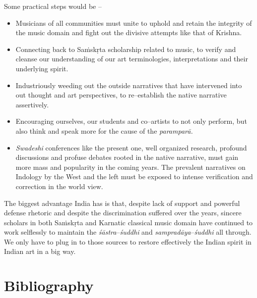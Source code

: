 Some practical steps would be –

\begin{itemize}
\item Musicians of all communities must unite to uphold and retain the integrity of the music domain and fight out the divisive attempts like that of Krishna.

 \item Connecting back to Saṁskṛta scholarship related to music, to verify and cleanse our understanding of our art terminologies, interpretations and their underlying spirit.

 \item Industriously weeding out the outside narratives that have intervened into out thought and art perspectives, to re–establish the native narrative assertively.

 \item Encouraging ourselves, our students and co–artists to not only perform, but also think and speak more for the cause of the \textit{paramparā.}

 \item \textit{Swadeshi} conferences like the present one, well organized research, profound discussions and profuse debates rooted in the native narrative, must gain more mass and popularity in the coming years. The prevalent narratives on Indology by the West and the left must be exposed to intense verification and correction in the world view.

\end{itemize}

The biggest advantage India has is that, despite lack of support and powerful defense rhetoric and despite the discrimination suffered over the years, sincere scholars in both Saṁskṛta and Karnatic classical music domain have continued to work selflessly to maintain the \textit{śāstra}–\textit{śuddhi} and \textit{sampradāya}–\textit{śuddhi} all through. We only have to plug in to those sources to restore effectively the Indian spirit in Indian art in a big way.


\section*{Bibliography}

